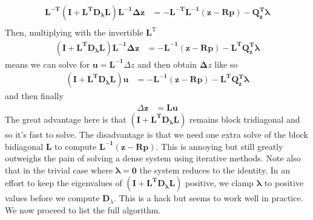 \documentclass[14pt]{extarticle}
\newcommand*{\vv}[1]{\mathbf{#1}}
\newcommand{\T}{\text{T}}
\begin{document}
\begin{align*}
\vv{L^{-T} (I + L^T D_\lambda L) L^{-1} \Delta z} &= \vv{-L^{-T} L^{-1} (z - Rp) - Q_z^{\T} \lambda} \\
\end{align*}
Then, multiplying with the invertible $\vv L^{\T}$
\begin{align*}
\vv{(I + L^T D_\lambda L)} \vv{L^{-1} \Delta z} &= \vv{-L^{-1} (z - Rp) - L^T
Q_z^{\T} \lambda}
\end{align*}
means we can solve for $\vv{u=L^{-1}}\Delta z$ and then obtain $\vv \Delta z$
like so
\begin{align*}
\vv{(I + L^T D_\lambda L) u} &=  \vv{-L^{-1} (z - Rp) - L^T Q_z^{\T} \lambda}
\end{align*}
and then finally
\begin{align*}
\Delta \vv{z} &= \vv{L u}
\end{align*}
The great advantage here is that $\vv{(I + L^T D_\lambda L) }$ remains block
tridiagonal and so it's fast to solve. The disadvantage is that we need one
extra
solve of the block bidiagonal $\vv L$ to compute $\vv{L^{-1} (z - Rp)}$. This is
annoying but still greatly outweighs the pain of solving a dense system using
iterative methods. Note also that in the trivial case where $\vv{\lambda = 0}$
the system reduces to the identity. In an effort to keep the eigenvalues of
$\vv{(I + L^T D_\lambda L) }$
positive, we clamp $\vv \lambda$ to positive values before we compute $\vv
D_\lambda$. This is a hack but seems to work well in practice. We now proceed to
list the full algorithm.
\newpage
\end{document}
